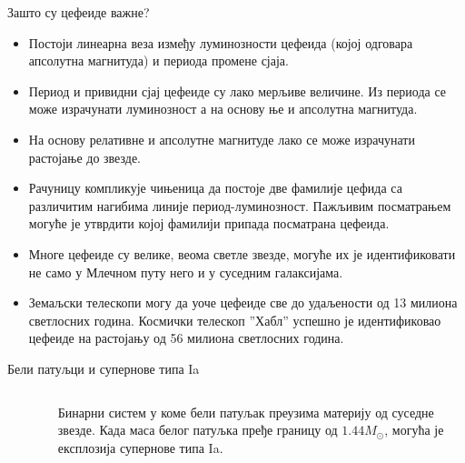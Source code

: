 \documentclass[aspectratio=169, xcolor=table, 10pt]{beamer}
\theoremstyle{definition}
\begin{document}
\begin{frame}{Зашто су цефеиде важне?}
  \begin{itemize}
    \item Постоји линеарна веза између луминозности цефеида (којој одговара апсолутна магнитуда) и периода промене сјаја.
    \item Период и привидни сјај цефеиде су лако мерљиве величине. Из периода се може израчунати луминозност а на основу ње и апсолутна магнитуда.
    \item На основу релативне и апсолутне магнитуде лако се може израчунати растојање до звезде.
    \item Рачуницу компликује чињеница да постоје две фамилије цефида са различитим нагибима линије период-луминозност. Пажљивим посматрањем могуће је утврдити којој фамилији припада посматрана цефеида.
    \item Многе цефеиде су велике, веома светле звезде, могуће их је идентификовати не само у Млечном путу него и у суседним галаксијама.
    \item Земаљски телескопи могу да уоче цефеиде све до удаљености од 13 милиона светлосних година. Космички телескоп ”Хабл” успешно је идентификовао цефеиде на растојању од 56 милиона светлосних година.
  \end{itemize}
\end{frame}

\begin{frame}{Бели патуљци и супернове типа Ia}
  \begin{columns}[T]
    \begin{column}{0.7\textwidth}
      \begin{figure}
        \centering
        \vspace{-1em}
      \end{figure}
    \end{column}
    \begin{column}{0.3\textwidth}
      Бинарни систем у коме бели патуљак преузима материју од суседне звезде. Када маса белог патуљка пређе границу од $1.44 M_{\odot}$, могућа је експлозија супернове типа Ia.
    \end{column}
  \end{columns}
\end{frame}
\end{document}
